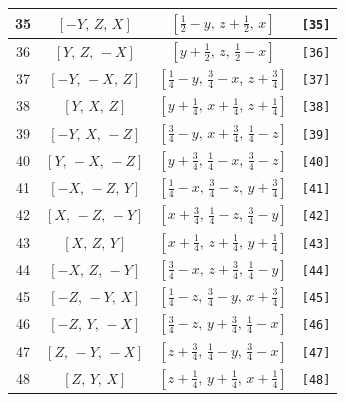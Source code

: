 \documentclass[fleqn,8pt]{jsarticle}
\begin{document}
\begin{longtable}{cccc}
35 & $\left[ - Y,\, Z,\, X \right]$ & $\left[ \frac{1}{2} - y,\, z + \frac{1}{2},\, x \right]$ & {\tt [35]} \\ \hline
36 & $\left[ Y,\, Z,\, - X \right]$ & $\left[ y + \frac{1}{2},\, z,\, \frac{1}{2} - x \right]$ & {\tt [36]} \\ \hline
37 & $\left[ - Y,\, - X,\, Z \right]$ & $\left[ \frac{1}{4} - y,\, \frac{3}{4} - x,\, z + \frac{3}{4} \right]$ & {\tt [37]} \\ \hline
38 & $\left[ Y,\, X,\, Z \right]$ & $\left[ y + \frac{1}{4},\, x + \frac{1}{4},\, z + \frac{1}{4} \right]$ & {\tt [38]} \\ \hline
39 & $\left[ - Y,\, X,\, - Z \right]$ & $\left[ \frac{3}{4} - y,\, x + \frac{3}{4},\, \frac{1}{4} - z \right]$ & {\tt [39]} \\ \hline
40 & $\left[ Y,\, - X,\, - Z \right]$ & $\left[ y + \frac{3}{4},\, \frac{1}{4} - x,\, \frac{3}{4} - z \right]$ & {\tt [40]} \\ \hline
41 & $\left[ - X,\, - Z,\, Y \right]$ & $\left[ \frac{1}{4} - x,\, \frac{3}{4} - z,\, y + \frac{3}{4} \right]$ & {\tt [41]} \\ \hline
42 & $\left[ X,\, - Z,\, - Y \right]$ & $\left[ x + \frac{3}{4},\, \frac{1}{4} - z,\, \frac{3}{4} - y \right]$ & {\tt [42]} \\ \hline
43 & $\left[ X,\, Z,\, Y \right]$ & $\left[ x + \frac{1}{4},\, z + \frac{1}{4},\, y + \frac{1}{4} \right]$ & {\tt [43]} \\ \hline
44 & $\left[ - X,\, Z,\, - Y \right]$ & $\left[ \frac{3}{4} - x,\, z + \frac{3}{4},\, \frac{1}{4} - y \right]$ & {\tt [44]} \\ \hline
45 & $\left[ - Z,\, - Y,\, X \right]$ & $\left[ \frac{1}{4} - z,\, \frac{3}{4} - y,\, x + \frac{3}{4} \right]$ & {\tt [45]} \\ \hline
46 & $\left[ - Z,\, Y,\, - X \right]$ & $\left[ \frac{3}{4} - z,\, y + \frac{3}{4},\, \frac{1}{4} - x \right]$ & {\tt [46]} \\ \hline
47 & $\left[ Z,\, - Y,\, - X \right]$ & $\left[ z + \frac{3}{4},\, \frac{1}{4} - y,\, \frac{3}{4} - x \right]$ & {\tt [47]} \\ \hline
48 & $\left[ Z,\, Y,\, X \right]$ & $\left[ z + \frac{1}{4},\, y + \frac{1}{4},\, x + \frac{1}{4} \right]$ & {\tt [48]} \\
\end{longtable}
\end{document}
